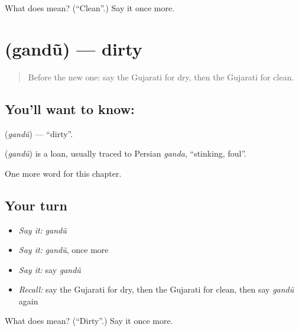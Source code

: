 \begin{tcolorbox}[breakable,colback=teal!4,colframe=teal!35!black,title={Before you move on}]
What does  mean? (\textquotedblleft{}Clean\textquotedblright{}.) Say it once more.
\end{tcolorbox}
\section[\texorpdfstring{\gu{ગંદું} (gandũ)}{ગંદું (gandũ)}]{ (gandũ) — dirty}

\label{lesson:GU-C132-gandu}



\begin{quote}
Before the new one: say the Gujarati for dry, then the Gujarati for clean.
\end{quote}

\subsection*{You'll want to know: }
\textbf{} (\emph{gandũ}) — \textquotedblleft{}dirty\textquotedblright{}.

\begin{cousinweb}
\textbf{} (\emph{gandũ}) is a loan, usually traced to Persian \emph{ganda}, \textquotedblleft{}stinking, foul\textquotedblright{}.
\end{cousinweb}

\begin{grammarlens}[title={What you've built}]
One more word for this chapter.
\end{grammarlens}

\subsection*{Your turn}
\begin{itemize}
\raggedright
  \item \emph{Say it:} \emph{gandũ}
  \item \emph{Say it:} \emph{gandũ}, once more
  \item \emph{Say it:} say \emph{gandũ}
  \item \emph{Recall:} say the Gujarati for dry, then the Gujarati for clean, then say \emph{gandũ} again
\end{itemize}

\begin{tcolorbox}[breakable,colback=teal!4,colframe=teal!35!black,title={Before you move on}]
What does  mean? (\textquotedblleft{}Dirty\textquotedblright{}.) Say it once more.
\end{tcolorbox}
